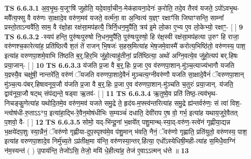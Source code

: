 \documentclass[17pt]{extarticle}
\begin{document}
                                        \textbf{ TS 6.6.3.1} \newline
                  अ॒व॒भृ॒थ॒-य॒जूꣳषि॑ जुहोति॒ यदे॒वार्वा॒चीन॒-मेक॑हायना॒देनः॑ क॒रोति॒ तदे॒व तैरव॑ यजते॒ ऽपो॑ऽवभृ॒थ-मवै᳚त्य॒फ्सु वै वरु॑णः सा॒क्षादे॒व वरु॑ण॒मव॑ यजते॒ वर्त्म॑ना॒ वा अ॒न्वित्य॑ य॒ज्ञ्ꣳ रक्षाꣳ॑सि जिघाꣳसन्ति॒ साम्ना᳚ प्रस्तो॒ताऽन्ववै॑ति॒ साम॒ वै र॑क्षो॒हा रक्ष॑सा॒मप॑हत्यै॒ त्रिर्नि॒धन॒मुपै॑ति॒ त्रय॑ इ॒मे लो॒का ए॒भ्य ए॒व लो॒केभ्यो॒ रक्षाꣳ॒॒- [  ] \textbf{  9} \newline
                  \newline
                                \textbf{ TS 6.6.3.2} \newline
                  -स्यप॑ हन्ति॒ पुरु॑षःपुरुषो नि॒धन॒मुपै॑ति॒ पुरु॑षःपुरुषो॒ हि र॑क्ष॒स्वी रक्ष॑सा॒मप॑हत्या उ॒रुꣳ हि राजा॒ वरु॑णश्च॒कारेत्या॑ह॒ प्रति॑ष्ठित्यै श॒तं ते॑ राजन् भि॒षजः॑ स॒हस्र॒मित्या॑ह भेष॒जमे॒वास्मै॑ करोत्य॒भिष्ठि॑तो॒ वरु॑णस्य॒ पाश॒ इत्या॑ह वरुणपा॒शमे॒वाभि ति॑ष्ठति ब॒र्॒.हिर॒भि जु॑हो॒त्याहु॑तीनां॒ प्रति॑ष्ठित्या॒ अथो॑ अग्नि॒वत्ये॒व जु॑हो॒त्यप॑ बर्.हिषः प्रया॒जान्- [  ] \textbf{  10} \newline
                  \newline
                                \textbf{ TS 6.6.3.3} \newline
                  य॑जति प्र॒जा वै ब॒र्॒.हिः प्र॒जा ए॒व व॑रुणपा॒शान्-मु॑ञ्च॒त्याज्य॑भागौ यजति य॒ज्ञ्स्यै॒व चक्षु॑षी॒ नान्तरे॑ति॒ वरु॑णं ॅयजति वरुणपा॒शादे॒वैनं॑ मुञ्चत्य॒ग्नीवरु॑णौ यजति सा॒क्षादे॒वैनं॑ ॅवरुणपा॒शान् मु॑ञ्च॒त्य-प॑बर्.हिषावनूय॒जौ य॑जति प्र॒जा वै ब॒र्॒.हिः प्र॒जा ए॒व व॑रुणपा॒शान्-मु॑ञ्चति च॒तुरः॑ प्रया॒जान्. य॑जति॒ द्वाव॑नूया॒जौ षट्थ् संप॑द्यन्ते॒ षड्वा ऋ॒तव॑- [  ] \textbf{  11} \newline
                  \newline
                                \textbf{ TS 6.6.3.4} \newline
                  ऋ॒तुष्वे॒व प्रति॑ तिष्ठ॒-त्यव॑भृथ-निचङ्कु॒णेत्या॑ह यथोदि॒तमे॒व वरु॑ण॒मव॑ यजते समु॒द्रे ते॒ हृद॑य-म॒फ्स्व॑न्तरित्या॑ह समु॒द्रे ह्य॑न्तर्वरु॑णः॒ सं त्वा॑ विश॒-न्त्वोष॑धी-रु॒ताऽऽ*प॒ इत्या॑हा॒द्भि-रे॒वैन॒मोष॑धीभिः स॒म्यञ्चं॑ दधाति॒ देवी॑राप ए॒ष वो॒ गर्भ॒ इत्या॑ह यथाय॒जुरे॒वैतत् प॒शवो॒ वै- [  ] \textbf{  12} \newline
                  \newline
                                \textbf{ TS 6.6.3.5} \newline
                  सोमो॒ यद्-भि॑न्दू॒नां भ॒क्षये᳚त् पशु॒मान्थ्-स्या॒द्-वरु॑ण॒-स्त्वे॑नं गृह्णीया॒द्यन्न भ॒क्षये॑दप॒शुः स्या॒न्नैनं॒ ॅवरु॑णो गृह्णीया-दुप॒स्पृश्य॑मे॒व प॑शु॒मान् भ॑वति॒ नैनं॒ ॅवरु॑णो गृह्णाति॒ प्रति॑युतो॒ वरु॑णस्य॒ पाश॒ इत्या॑ह वरुणपा॒शादे॒व निर्मु॑च्य॒ते ऽप्र॑तीक्ष॒मा य॑न्ति॒ वरु॑णस्या॒न्तर्.हि॑त्या॒ एधो᳚ऽस्येधिषी॒मही-त्या॑ह स॒मिधै॒वाग्निं न॑म॒स्यन्त॑ ( ) उ॒पाय॑न्ति॒ तेजो॑ऽसि॒ तेजो॒ मयि॑ धे॒हीत्या॑ह॒ तेज॑ ए॒वाऽऽत्मन् ध॑त्ते ॥ \textbf{  13} \newline
\end{document}
